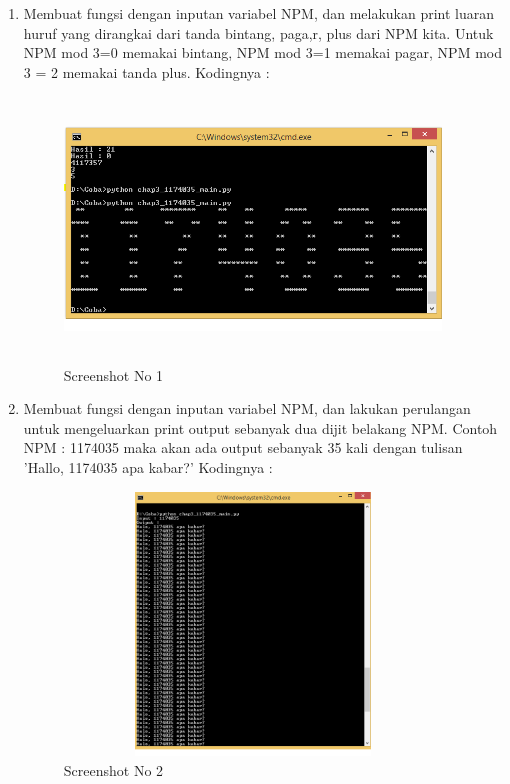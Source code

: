 \begin{enumerate}
	\item Membuat fungsi dengan inputan variabel NPM, dan melakukan print luaran huruf yang dirangkai dari tanda bintang, paga,r, plus dari NPM kita. Untuk NPM mod 3=0 memakai bintang, NPM mod 3=1 memakai pagar, NPM mod 3 = 2 memakai tanda plus. Kodingnya : 
	
	\begin{figure}[!htbp]
        \centering
        \includegraphics[height=7cm, width=10cm]{figures/chapter3/1174035_1.png}
        \caption{Screenshot No 1}
        \label{1174035_1}
	\end{figure}
	\item Membuat fungsi dengan inputan variabel NPM, dan lakukan perulangan untuk mengeluarkan print output sebanyak dua dijit belakang NPM. Contoh NPM : 1174035 maka akan ada output sebanyak 35 kali dengan tulisan 'Hallo, 1174035 apa kabar?' Kodingnya : 
	
	\begin{figure}[!htbp]
        \centering
        \includegraphics[height=7cm, width=10cm]{figures/chapter3/1174035_2.png}
        \caption{Screenshot No 2}
        \label{1174035_2}

\end{figure}
\end{enumerate}
